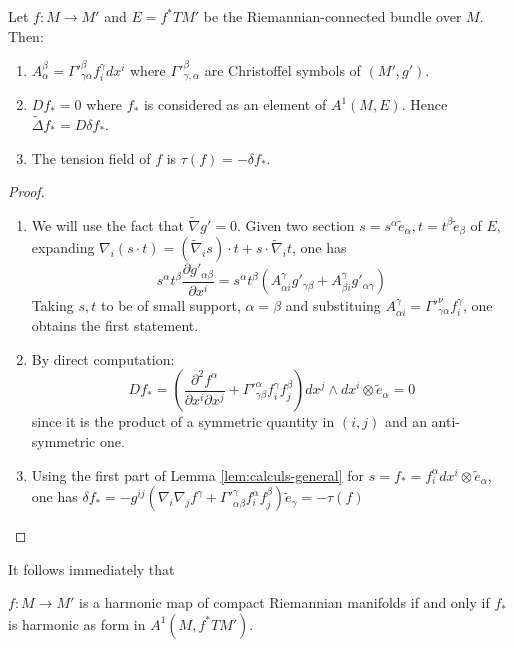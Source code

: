 \begin{proposition}
\label{prop:calculs-pullback-tangent}
Let \(f: M \longrightarrow M'\) and \(E = f^* TM'\) be the Riemannian-connected bundle
over \(M\). Then:
\begin{enumerate}
\item \(A^\beta_\alpha = \Gamma'^{\beta}_{\gamma\alpha} f_i^\gamma dx^i\) where \(\Gamma'^{\beta}_{\gamma,\alpha}\) are Christoffel symbols of \((M',g')\).
\item \(Df_* = 0\) where \(f_*\) is considered as an element of \(A^1(M,E)\). Hence \(\tilde\Delta f_*= D\delta f_*\).
\item The tension field of \(f\) is \(\tau (f) = -\delta f_*\).
\end{enumerate}
\end{proposition}
\begin{proof}
\begin{enumerate}
\item We will use the fact that \(\tilde\nabla g' = 0\). Given two section \(s=s^\alpha
   \tilde e_\alpha,t=t^\beta \tilde e_\beta\) of \(E\), expanding
\(\nabla_i(s\cdot t) = (\tilde\nabla_i s)\cdot t +s\cdot \tilde\nabla_i t\), one has
\[ 
   s^\alpha t^\beta \frac{\partial g'_{\alpha\beta}}{\partial x^i} = s^\alpha t^\beta
   \left( A^\gamma_{\alpha i} g'_{\gamma\beta} + A^\gamma_{\beta i} g'_{\alpha\gamma}\right)
   \]
Taking \(s,t\) to be of small support, \(\alpha=\beta\) and substituing \(A^\gamma_{\alpha i} = \Gamma'^\nu_{\gamma\alpha}f^\gamma_i\), one obtains the first statement.
\item By direct computation:
\[
    D f_* = \left(\frac{\partial^2 f^\alpha}{\partial x^i \partial x^j} +
   \Gamma'^\alpha_{\gamma\beta} f^\gamma_i f^\beta_j \right)dx^j\wedge dx^i\otimes
   \tilde e_\alpha = 0 
   \]
since it is the product of a symmetric quantity in \((i,j)\) and an anti-symmetric one.
\item Using the first part of Lemma \ref{lem:calculs-general} for \(s=f_* = f^\alpha_i dx^i\otimes
   \tilde e_\alpha\), one has \(\delta f_* = -g^{ij}\left(\nabla_i\nabla_j f^\gamma +
   \Gamma'^\gamma_{\alpha\beta} f^\alpha_i f^\beta_j\right)\tilde e_\gamma=-\tau(f)\)
\end{enumerate}
\end{proof}

It follows immediately that
\begin{corollary}
\(f: M \longrightarrow M'\) is a harmonic map of compact Riemannian manifolds if and only if \(f_*\) is harmonic as form in \(A^1(M,f^* TM')\).
\end{corollary}

